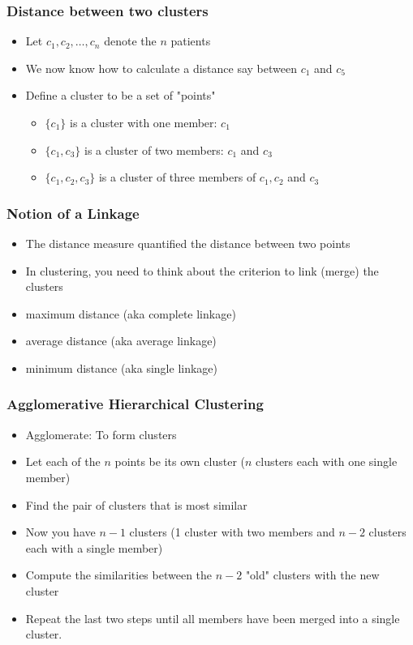 \documentclass[xcolor=x11names,compress]{beamer}\usepackage[]{graphicx}\usepackage[]{color}
\begin{document}
\begin{frame}
  \frametitle{Distance between two clusters}
  \begin{itemize}
  \item Let $c_1,c_2,\ldots,c_n$ denote the $n$ patients
  \item We now know how to calculate a distance say between $c_1$ and $c_5$
  \item Define a cluster to be a set of "points"
    \begin{itemize}
    \item $\{c_1\}$ is a cluster with one member: $c_1$
    \item $\{c_1,c_3\}$ is a cluster of two members: $c_1$ and $c_3$
    \item $\{c_1,c_2,c_3\}$ is a cluster of three members of $c_1,c_2$ and $c_3$
    \end{itemize}
  \end{itemize}
\end{frame}


\begin{frame}
  \frametitle{Notion of a Linkage}
  \begin{itemize}
\item The distance measure quantified the distance between two points
\item In clustering, you need to think about the criterion to link (merge)
      the clusters
\item maximum distance (aka complete linkage)
\item average distance (aka average linkage)
\item minimum distance (aka single linkage)
\end{itemize}
\end{frame}




\begin{frame}
  \frametitle{Agglomerative Hierarchical Clustering}
  \begin{itemize}
\item Agglomerate: To form clusters
\item Let each of the $n$ points be its own cluster ($n$ clusters each with one single member)
\item Find the pair of clusters that is most similar
\item Now you have $n-1$ clusters (1 cluster with two members and $n-2$ clusters each with a single member)
\item Compute the similarities between the $n-2$ "old" clusters with the new cluster
\item Repeat the last two steps until all members have been merged into a single cluster.
\end{itemize}
\end{frame}
\end{document}
